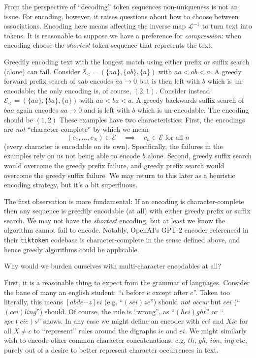 \documentclass[11pt, oneside]{amsart}   	%
\begin{document}
From the perspective of ``decoding'' token sequences non-uniqueness is not an issue. For encoding, however, it raises questions about how to choose between associations. Encoding here means affecting the inverse map $\mathcal{L}^{-1}$ to turn text into tokens. It is reasonable to suppose we have a preference for {\em compression}: when encoding choose the {\em shortest} token sequence that represents the text. 

Greedily encoding text with the longest match using either prefix or suffix search (alone) can fail. Consider $\mathcal{E}_{<} = (\{aa\},\{ab\},\{a\})$ with $aa < ab < a$. A greedy forward prefix search of $aab$ encodes $aa \to 0$ but is then left with $b$ which is un-encodable; the only encoding is, of course, $(2,1)$. Consider instead $\mathcal{E}_{<} = (\{aa\},\{ba\},\{a\})$ with $aa < ba < a$. A greedy backwards suffix search of $baa$ again encodes $aa \to 0$ and is left with $b$ which is un-encodable. The encoding should be $(1,2)$ These examples have two characteristics: First, the encodings are {\em not} ``character-complete'' by which we mean 
\begin{equation*}
	(c_1, \dotsc, c_N) \in \mathcal{E} \quad\implies\quad c_n \in \mathcal{E} \text{ for all } n
\end{equation*}
(every character is encodable on its own). Specifically, the failures in the examples rely on us not being able to encode $b$ alone. Second, greedy suffix search would overcome the greedy prefix failure, and greedy prefix search would overcome the greedy suffix failure. We may return to this later as a heuristic encoding strategy, but it's a bit superfluous. 

The first observation is more fundamental: If an encoding is character-complete then any sequence is greedily encodable (at all) with either greedy prefix or suffix search. We may not have the {\em shortest} encoding, but at least we know the algorithm cannot fail to encode. Notably, OpenAI's GPT-2 encoder referenced in their \texttt{tiktoken} codebase is character-complete in the sense defined above, and hence greedy algorithms could be applicable. 

Why would we burden ourselves with multi-character encodables at all? 

First, it is a reasonable thing to expect from the grammar of languages. Consider the bane of many an english student: ``$i$ before $e$ except after $c$''. Taken too literally, this means $[abde \dotsb z]ei$ (e.g. ``$(sei)ze$'') should {\em not occur} but $cei$ (``$(cei)ling$'') should. Of course, the rule is ``wrong'', as ``$(hei)ght$'' or ``$spe(cie)s$'' shows. In any case we might define an encoder with $cei$ and $Xie$ for all $X \neq c$ to ``represent'' rules around the digraphs $ie$ and $ei$. We might similarly wish to encode other common character concatenations, e.g. $th$, $gh$, $ion$, $ing$ etc, purely out of a desire to better represent character occurrences in text. 
\end{document}
